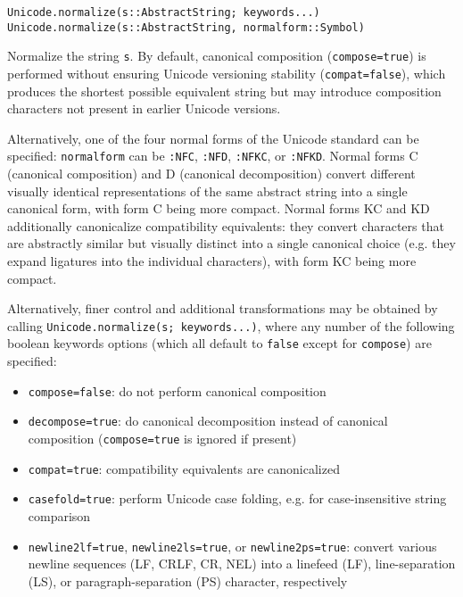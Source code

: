 \begin{adjustwidth}{2em}{0pt}


\begin{verbatim}
Unicode.normalize(s::AbstractString; keywords...)
Unicode.normalize(s::AbstractString, normalform::Symbol)
\end{verbatim}

Normalize the string \texttt{s}. By default, canonical composition (\texttt{compose=true}) is performed without ensuring Unicode versioning stability (\texttt{compat=false}), which produces the shortest possible equivalent string but may introduce composition characters not present in earlier Unicode versions.

Alternatively, one of the four {\textquotedbl}normal forms{\textquotedbl} of the Unicode standard can be specified: \texttt{normalform} can be \texttt{:NFC}, \texttt{:NFD}, \texttt{:NFKC}, or \texttt{:NFKD}.  Normal forms C (canonical composition) and D (canonical decomposition) convert different visually identical representations of the same abstract string into a single canonical form, with form C being more compact.  Normal forms KC and KD additionally canonicalize {\textquotedbl}compatibility equivalents{\textquotedbl}: they convert characters that are abstractly similar but visually distinct into a single canonical choice (e.g. they expand ligatures into the individual characters), with form KC being more compact.

Alternatively, finer control and additional transformations may be obtained by calling \texttt{Unicode.normalize(s; keywords...)}, where any number of the following boolean keywords options (which all default to \texttt{false} except for \texttt{compose}) are specified:

\begin{itemize}
\item \texttt{compose=false}: do not perform canonical composition


\item \texttt{decompose=true}: do canonical decomposition instead of canonical composition (\texttt{compose=true} is ignored if present)


\item \texttt{compat=true}: compatibility equivalents are canonicalized


\item \texttt{casefold=true}: perform Unicode case folding, e.g. for case-insensitive string comparison


\item \texttt{newline2lf=true}, \texttt{newline2ls=true}, or \texttt{newline2ps=true}: convert various newline sequences (LF, CRLF, CR, NEL) into a linefeed (LF), line-separation (LS), or paragraph-separation (PS) character, respectively



\end{itemize}
\end{adjustwidth}
